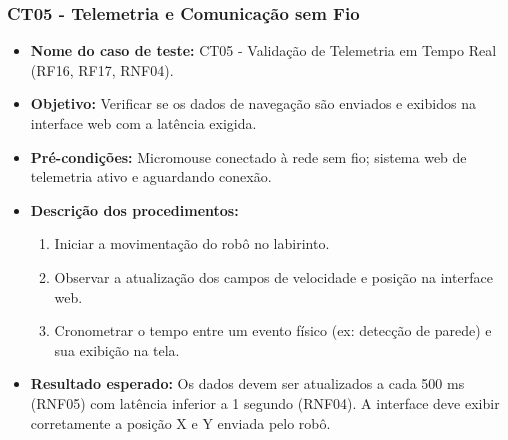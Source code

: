     \subsubsection{CT05 - Telemetria e Comunicação sem Fio}
    \begin{itemize}
        \item \textbf{Nome do caso de teste:} CT05 - Validação de Telemetria em Tempo Real (RF16, RF17, RNF04).
        \item \textbf{Objetivo:} Verificar se os dados de navegação são enviados e exibidos na interface web com a latência exigida.
        \item \textbf{Pré-condições:} Micromouse conectado à rede sem fio; sistema web de telemetria ativo e aguardando conexão.
        \item \textbf{Descrição dos procedimentos:}
        \begin{enumerate}
            \item Iniciar a movimentação do robô no labirinto.
            \item Observar a atualização dos campos de velocidade e posição na interface web.
            \item Cronometrar o tempo entre um evento físico (ex: detecção de parede) e sua exibição na tela.
        \end{enumerate}
        \item \textbf{Resultado esperado:} Os dados devem ser atualizados a cada 500 ms (RNF05) com latência inferior a 1 segundo (RNF04). A interface deve exibir corretamente a posição X e Y enviada pelo robô.
    \end{itemize}


